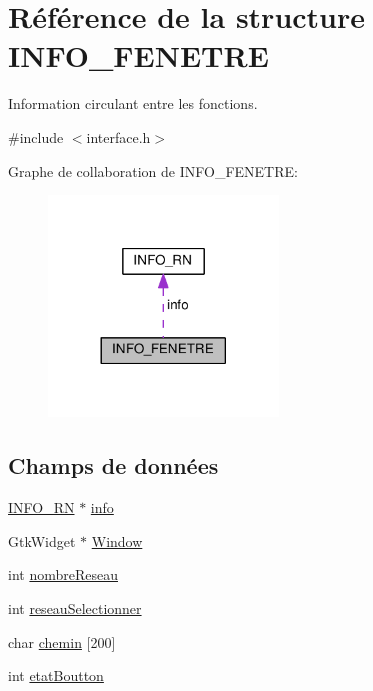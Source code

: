 \hypertarget{structINFO__FENETRE}{}\section{Référence de la structure I\+N\+F\+O\+\_\+\+F\+E\+N\+E\+T\+RE}
\label{structINFO__FENETRE}


Information circulant entre les fonctions.  




{\ttfamily \#include $<$interface.\+h$>$}



Graphe de collaboration de I\+N\+F\+O\+\_\+\+F\+E\+N\+E\+T\+RE\+:\nopagebreak
\begin{figure}[H]
\begin{center}
\leavevmode
\includegraphics[width=173pt]{structINFO__FENETRE__coll__graph}
\end{center}
\end{figure}
\subsection*{Champs de données}
\begin{DoxyCompactItemize}
\item 
\hyperlink{structINFO__RN}{I\+N\+F\+O\+\_\+\+RN} $\ast$ \hyperlink{structINFO__FENETRE_a11f9a61d9418b5b167ac2c2dbfa99dac}{info}
\item 
Gtk\+Widget $\ast$ \hyperlink{structINFO__FENETRE_ad55c62f85a92f3163bca921dc73336dc}{Window}
\item 
int \hyperlink{structINFO__FENETRE_ab88f2bbddff749e8003f2b3178fd5602}{nombre\+Reseau}
\item 
int \hyperlink{structINFO__FENETRE_a87ac81a3d0227737e3228bd5ad1f975d}{reseau\+Selectionner}
\item 
char \hyperlink{structINFO__FENETRE_a45ef7a5a1039c09dcb82975b4a070c21}{chemin} \mbox{[}200\mbox{]}
\item 
int \hyperlink{structINFO__FENETRE_ac0a8053617f09b84823e045c847bfdd6}{etat\+Boutton}
\end{DoxyCompactItemize}


